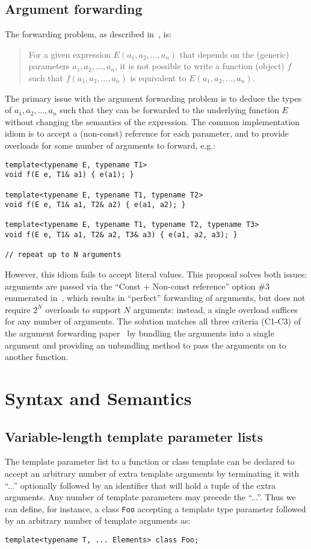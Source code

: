 \documentclass{article}
\begin{document}
\subsection{Argument forwarding}
The forwarding problem, as described in~\cite{Dimov02}, is:

\begin{quote}
  For a given expression $E(a_1, a_2, ..., a_n)$ that depends on the
  (generic) parameters $a_1, a_2, ..., a_n$, it is not possible to
  write a function (object) $f$ such that $f(a_1, a_2, ..., a_n)$ is
  equivalent to $E(a_1, a_2, ..., a_n)$.
\end{quote}

The primary issue with the argument forwarding problem is to deduce
the types of $a_1, a_2, ..., a_n$ such that they can be forwarded to
the underlying function $E$ without changing the semantics of the
expression. The common implementation idiom is to accept a (non-const)
reference for each parameter, and to provide overloads for some number
of arguments to forward, e.g.:
\begin{verbatim}
template<typename E, typename T1>
void f(E e, T1& a1) { e(a1); }

template<typename E, typename T1, typename T2>
void f(E e, T1& a1, T2& a2) { e(a1, a2); }

template<typename E, typename T1, typename T2, typename T3>
void f(E e, T1& a1, T2& a2, T3& a3) { e(a1, a2, a3); }

// repeat up to N arguments
\end{verbatim}

However, this idiom fails to accept literal values. This proposal
solves both issues: arguments are passed via the ``Const + Non-const
reference'' option \#3 enumerated in~\cite{Dimov02}, which results in
``perfect'' forwarding of arguments, but does not require $2^N$
overloads to support $N$ arguments: instead, a single overload
suffices for any number of arguments. The solution matches all three
criteria (C1-C3) of the argument forwarding paper~\cite{Dimov02} by
bundling the arguments into a single argument and providing an
unbundling method to pass the arguments on to another function.

\section{Syntax and Semantics}
\subsection{Variable-length template parameter lists}
\par The template parameter list to a function or class template can
be declared to accept an arbitrary number of extra template arguments
by terminating it with ``...'' optionally followed by an identifier
that will hold a tuple of the extra arguments. Any number of template
parameters may precede the ``...''. Thus we can define, for instance,
a class {\tt Foo} accepting a template type parameter followed by an
arbitrary number of template arguments as:
\begin{verbatim}
template<typename T, ... Elements> class Foo;
\end{verbatim}
\end{document}
